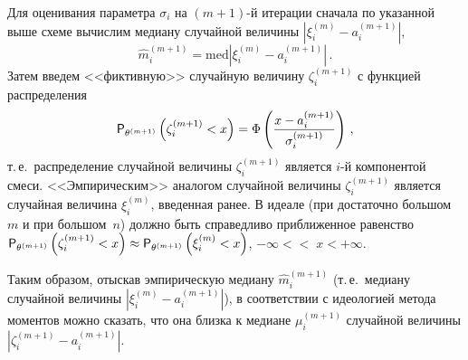 \begin{multicols}{2}
Для оценивания параметра $\sigma_i$ на $(m+1)$-й итерации сначала
по указанной выше схеме вычислим медиану случайной величины
$\left | \xi_i^{(m)}-a_i^{(m+1)}\right |$,
$$
\widehat m_i^{(m+1)}=\mathrm{med}\left |\xi_i^{(m)}-a_i^{(m+1)}\right |\,.
$$
Затем введем <<фиктивную>> случайную величину $\zeta_i^{(m+1)}$ с
функцией распределения
$$
{\sf P}_{\theta^{(m+1)}}\left ( \zeta_i^{(m+1)}<x\right ) =\Phi\left(\displaystyle\frac{\displaystyle x-a_i^{(m+1)}\mathstrut}{\displaystyle \sigma_i^{(m+1)}\mathstrut}\right)\,,
$$
т.\,е.\ распределение случайной величины $\zeta_i^{(m+1)}$
является $i$-й компонентой смеси. <<Эмпирическим>> аналогом
случайной величины $\zeta_i^{(m+1)}$ является случайная величина
$\xi_i^{(m)}$, введенная ранее. В идеале (при достаточно большом
$m$ и при большом~$n$) должно быть справедливо приближенное
равенство ${\sf P}_{\theta^{( m+1)}}\left(\zeta_i^{(m+1)}<x\right )\approx{\sf
P}_{\theta^{(m+1)}}\left ( \xi_i^{(m)}<x\right )$, $-\infty<$\linebreak $<\;x<+\infty$.

Таким образом, отыскав эмпирическую медиану $\widehat m_i^{(m+1)}$
(т.\,е.\ медиану случайной величины
$\left |\xi_i^{(m)}-a_i^{(m+1)}\right |$), в соответствии с идеологией
метода моментов можно сказать, что она близка к медиане
$\mu_i^{(m+1)}$ случайной величины
$\left |\zeta_i^{(m+1)}-a_i^{(m+1)}\right |$.


\end{multicols}
